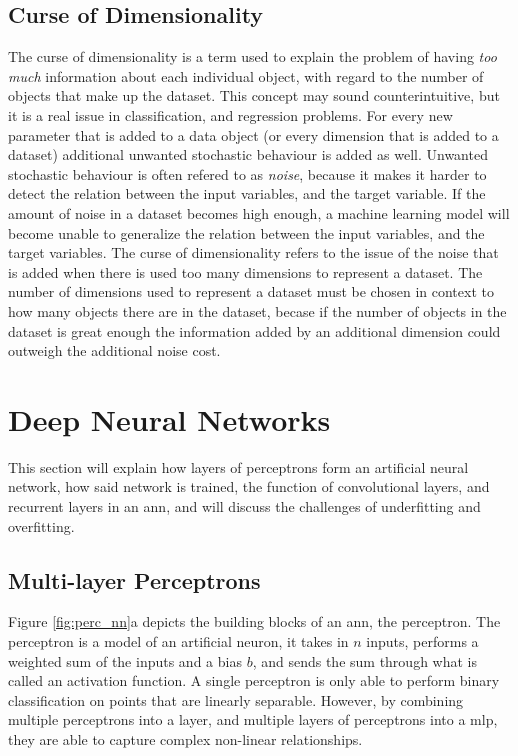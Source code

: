 \subsection{Curse of Dimensionality}
The curse of dimensionality is a term used to explain the problem of having \textit{too much} information about each individual object, with regard to the number of objects that make up the dataset. This concept may sound counterintuitive, but it is a real issue in classification, and regression problems. For every new parameter that is added to a data object (or every dimension that is added to a dataset) additional unwanted stochastic behaviour is added as well. Unwanted stochastic behaviour is often refered to as \textit{noise}, because it makes it harder to detect the relation between the input variables, and the target variable. If the amount of noise in a dataset becomes high enough, a machine learning model will become unable to generalize the relation between the input variables, and the target variables. The curse of dimensionality refers to the issue of the noise that is added when there is used too many dimensions to represent a dataset. The number of dimensions used to represent a dataset must be chosen in context to how many objects there are in the dataset, becase if the number of objects in the dataset is great enough the information added by an additional dimension could outweigh the additional noise cost.

\clearpage

\section{Deep Neural Networks} \label{sec:ann}

This section will explain how layers of perceptrons form an artificial neural network, how said network is trained, the function of convolutional layers, and recurrent layers in an \acrshort{ann}, and will discuss the challenges of underfitting and overfitting.

\subsection{Multi-layer Perceptrons} \label{sec:mlp}
Figure \ref{fig:perc_nn}a depicts the building blocks of an \acrshort{ann}, the perceptron. 
The perceptron is a model of an artificial neuron, it takes in $n$ inputs, performs a weighted sum of the inputs and a bias $b$, and sends the sum through what is called an activation function. A single perceptron is only able to perform binary classification on points that are linearly separable. However, by combining multiple perceptrons into a layer, and multiple layers of perceptrons into a \acrfull{mlp}, they are able to capture complex non-linear relationships. 

